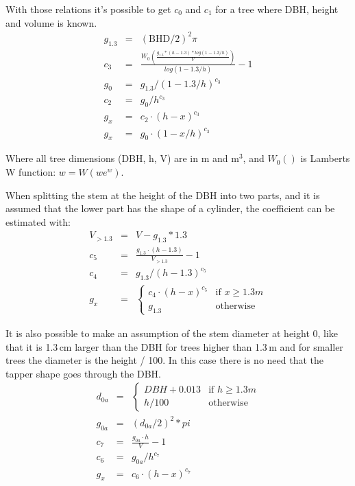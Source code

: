 \documentclass[twocolumn,10pt]{article}
\begin{document}
With those relations it's possible to get $c_0$ and $c_1$ for a tree where DBH,
height and volume is known.
\begin{eqnarray*}
g_{1.3} & = & (\text{BHD}/2)^2\pi\\
c_3 & = & \frac{W_0\left(\frac{g_{1.3}*(h-1.3)*log(1-1.3/h)}{V}\right)}{log(1 - 1.3/h)} - 1\\
g_0 & = & g_{1.3} / (1-1.3/h)^{c_3}\\
c_2 & = & g_0 / h^{c_3}\\
g_x & = & c_2 \cdot (h - x)^{c_3}\\
g_x & = & g_0 \cdot (1 - x/h)^{c_3}
\end{eqnarray*}

Where all tree dimensions (DBH, h, V) are in m and m$^3$,
and $W_0()$ is Lamberts W function: $w = W(we^w)$.

When splitting the stem at the height of the DBH into two parts, and it is
assumed that the lower part has the shape of a cylinder, the coefficient can be
estimated with:
\begin{eqnarray*}
V_{>1.3} & = & V - g_{1.3} * 1.3\\
c_5 & = & \frac{g_{1.3} \cdot (h - 1.3)}{V_{>1.3}} - 1\\
c_4 & = & g_{1.3} / (h-1.3)^{c_5}\\
g_x & = & \begin{cases}
    c_4 \cdot (h - x)^{c_5} & \text{if } x\geq 1.3m\\
    g_{1.3}               & \text{otherwise}
    \end{cases}
\end{eqnarray*}

It is also possible to make an assumption of the stem diameter at height 0, like
that it is 1.3\,cm larger than the DBH for trees higher than 1.3\,m and for
smaller trees the diameter is the height / 100. In this case there is no need that the tapper shape goes through the DBH.
\begin{eqnarray*}
d_{0a} & = & \begin{cases}
    DBH + 0.013 & \text{if } h\geq 1.3m\\
    h / 100     & \text{otherwise}
    \end{cases}\\
g_{0a} & = & (d_{0a}/2)^2*pi\\
c_7 & = & \frac{g_{0a} \cdot h}{V} - 1\\
c_6 & = & g_{0a} / h^{c_7}\\
g_x & = & c_6 \cdot (h - x)^{c_7}\\
\end{eqnarray*}
\end{document}
